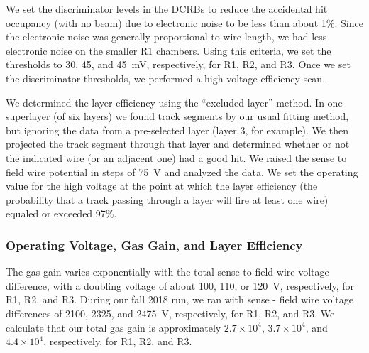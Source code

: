 We set the discriminator levels in the DCRBs to reduce the accidental hit occupancy (with no beam) due to
electronic noise to be less than about 1\%.  Since the electronic noise was generally proportional to wire length,
we had less electronic noise on the smaller R1 chambers.  Using this criteria, we set the thresholds to 30, 45,
and 45~mV, respectively, for R1, R2, and R3.  
Once we set the discriminator thresholds, we performed a high voltage efficiency scan.  

We determined the layer efficiency using the ``excluded layer'' method.  In one superlayer (of six layers) we
found track segments by our usual fitting method, but ignoring the data from a pre-selected layer (layer 3, for
example).  We then projected the track segment through that layer and determined whether or not the indicated
wire (or an adjacent one) had a good hit.
We raised the sense to field wire potential in
steps of 75~V and analyzed the data.  We set the operating value for the high voltage at the point at which
the layer efficiency (the probability that a track passing through a layer will fire at least one wire) equaled or
exceeded 97\%.



\subsubsection{Operating Voltage, Gas Gain, and Layer Efficiency}
\label{operating-voltage}

The gas gain varies exponentially with the total sense to field wire voltage
difference, with a doubling voltage of about 100, 110, or 120~V, respectively, for
R1, R2, and R3.  During our fall 2018 run, we ran with sense - field wire voltage
differences of 2100, 2325, and 2475~V, respectively, for R1, R2, and R3.
We calculate that our total gas gain is approximately 
$2.7 \times 10^4$, $3.7 \times 10^4$, and $4.4 \times 10^4$,  
respectively, for R1, R2, and R3.

